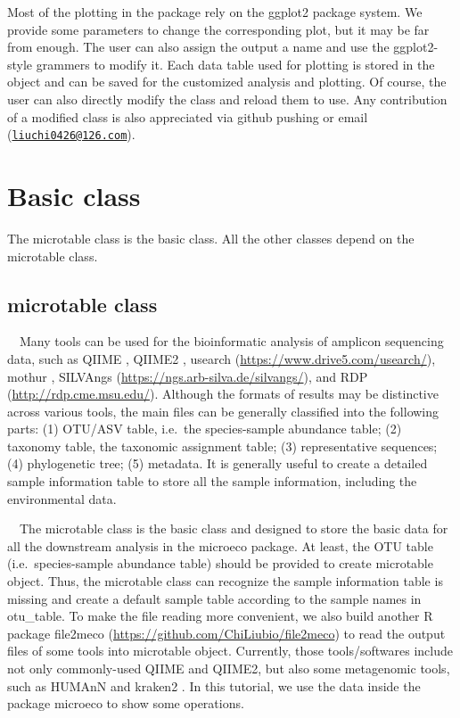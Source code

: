 \documentclass[
]{book}
\begin{document}
Most of the plotting in the package rely on the ggplot2 package system.
We provide some parameters to change the corresponding plot, but it may be far from enough.
The user can also assign the output a name and use the ggplot2-style grammers to modify it.
Each data table used for plotting is stored in the object and can be saved for the customized analysis and plotting.
Of course, the user can also directly modify the class and reload them to use.
Any contribution of a modified class is also appreciated via github pushing or email (\href{mailto:liuchi0426@126.com}{\nolinkurl{liuchi0426@126.com}}).

\hypertarget{basic-class}{%
\chapter{Basic class}\label{basic-class}}

The microtable class is the basic class.
All the other classes depend on the microtable class.

\hypertarget{microtable-class}{%
\section{microtable class}\label{microtable-class}}

　Many tools can be used for the bioinformatic analysis of amplicon sequencing data, such as QIIME \citep{Caporaso_QIIME_2010}, QIIME2 \citep{Bolyen_Reproducible_2019},
usearch (\url{https://www.drive5.com/usearch/}), mothur \citep{Schloss_Introducing_2009},
SILVAngs (\url{https://ngs.arb-silva.de/silvangs/}),
and RDP (\url{http://rdp.cme.msu.edu/}).
Although the formats of results may be distinctive across various tools, the main files can be generally classified into the following parts:
(1) OTU/ASV table, i.e.~the species-sample abundance table;
(2) taxonomy table, the taxonomic assignment table;
(3) representative sequences;
(4) phylogenetic tree;
(5) metadata. It is generally useful to create a detailed sample information table to store all the sample information,
including the environmental data.

　The microtable class is the basic class and designed to store the basic data for all the downstream analysis in the microeco package.
At least, the OTU table (i.e.~species-sample abundance table) should be provided to create microtable object.
Thus, the microtable class can recognize the sample information table is missing and create a default sample table according to
the sample names in otu\_table.
To make the file reading more convenient,
we also build another R package file2meco (\url{https://github.com/ChiLiubio/file2meco}) to read the output files of some tools into microtable object.
Currently, those tools/softwares include not only commonly-used QIIME \citep{Caporaso_QIIME_2010} and QIIME2\citep{Bolyen_Reproducible_2019},
but also some metagenomic tools, such as HUMAnN \citep{Franzosa_Species_2018} and kraken2 \citep{Wood_Improved_2019}.
In this tutorial, we use the data inside the package microeco to show some operations.
\end{document}
